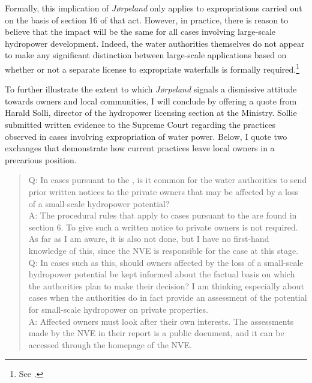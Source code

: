 Formally, this implication of {\it Jørpeland} only applies to expropriations carried out on the basis of section 16 of that act. However, in practice, there is reason to believe that the impact will be the same for all cases involving large-scale hydropower development. Indeed, the water authorities themselves do not appear to make any significant distinction between large-scale applications based on whether or not a separate license to expropriate waterfalls is formally required.\footnote{See \cite{flatby08}.}

To further illustrate the extent to which {\it Jørpeland} signals a dismissive attitude towards owners and local communities, I will conclude by offering a quote from Harald Solli, director of the hydropower licensing section at the Ministry. Sollie submitted written evidence to the Supreme Court regarding the practices observed in cases involving expropriation of water power. Below, I quote two exchanges that demonstrate how current practices leave local owners in a precarious position.

\begin{quote}
Q: In cases pursuant to the \cite{wra17}, is it common for the water authorities to send prior written notices to the private owners that may be affected by a loss of a small-scale hydropower potential? \\
A: The procedural rules that apply to cases pursuant to the \cite{wra17} are found in section 6. To give such a written notice to private owners is not required. As far as I am aware, it is also not done, but I have no first-hand knowledge of this, since the NVE is responsible for the case at this stage. \\
Q: In cases such as this, should owners affected by the loss of a small-scale hydropower potential be kept informed about the factual basis on which the authorities plan to make their decision? I am thinking especially about cases when the authorities do in fact provide an assessment of the potential for small-scale hydropower on private properties. \\
A: Affected owners must look after their own interests. The assessments made by the NVE in their report is a public document, and it can be accessed through the homepage of the NVE.
\end{quote}

